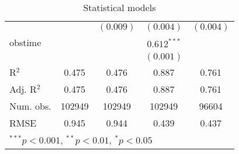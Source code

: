 \begin{table}
\begin{center}
{\begin{tabular}{l c c c c }
                               &                & $(0.009)$      & $(0.004)$      & $(0.004)$      \\
  obstime                      &                &                & $0.612^{***}$  &                \\
                               &                &                & $(0.001)$      &                \\
  \hline
  R$^2$                        & 0.475          & 0.476          & 0.887          & 0.761          \\
  Adj. R$^2$                   & 0.475          & 0.476          & 0.887          & 0.761          \\
  Num. obs.                    & 102949         & 102949         & 102949         & 96604          \\
  RMSE                         & 0.945          & 0.944          & 0.439          & 0.437          \\
  \hline
  \multicolumn{5}{l}{\scriptsize{$^{***}p<0.001$, $^{**}p<0.01$, $^*p<0.05$}}
  \end{tabular}%
}
\caption{Statistical models}
\label{tab:fit_qaly}
\end{center}
\end{table}
